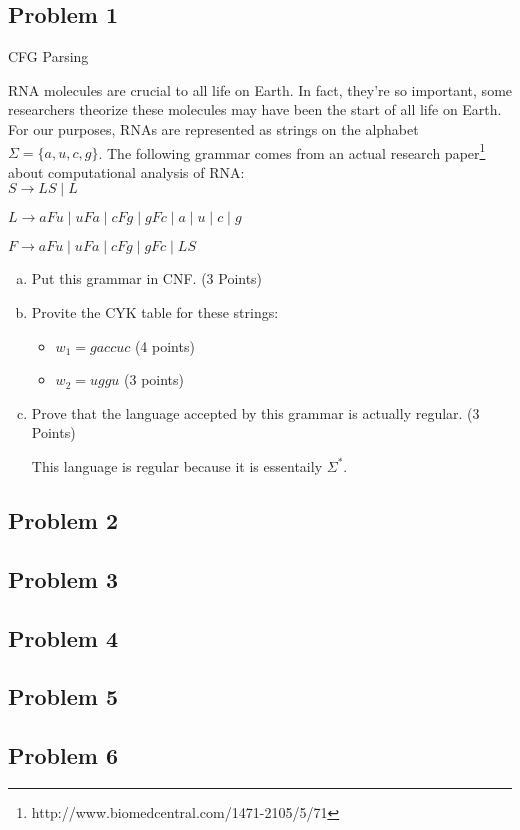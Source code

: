 \documentclass{article}
\begin{document}
\subsection*{Problem 1}
CFG Parsing

RNA molecules are crucial to all life on Earth.  In fact, they're so important, some researchers
theorize these molecules may have been the start of all life on Earth. For our purposes, RNAs are
represented as strings on the alphabet $\Sigma=\{a,u,c,g\}$.  The following grammar comes from an
actual research paper\footnote{http://www.biomedcentral.com/1471-2105/5/71} about computational
analysis of RNA: \\

    $S \rightarrow LS \;|\; L$

    $L \rightarrow aFu \;|\; uFa \;|\; cFg \;|\; gFc \;|\; a \;|\; u \;|\; c \;|\; g$

    $F \rightarrow aFu \;|\; uFa \;|\; cFg \;|\; gFc \;|\; LS$

\begin{enumerate}[(a)]
\item Put this grammar in CNF. (3 Points)
\item Provite the CYK table for these strings:
    \begin{itemize}
        \item $w_1=gaccuc$ (4 points)
        \item $w_2=uggu$ (3 points)
    \end{itemize}

\item Prove that the language accepted by this grammar is actually regular. (3 Points)

This language is regular because it is essentaily $\Sigma^*$.

\end{enumerate}

\newpage
\subsection*{Problem 2}

\newpage
\subsection*{Problem 3}

\newpage
\subsection*{Problem 4}

\newpage
\subsection*{Problem 5}

\newpage
\subsection*{Problem 6}
\end{document}
